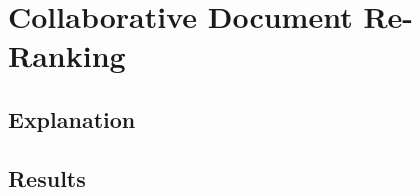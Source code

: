 \documentclass[12pt]{amsart}
\begin{document}
\section{Collaborative Document Re-Ranking}
\subsection{Explanation}
\subsection{Results}
\end{document}
